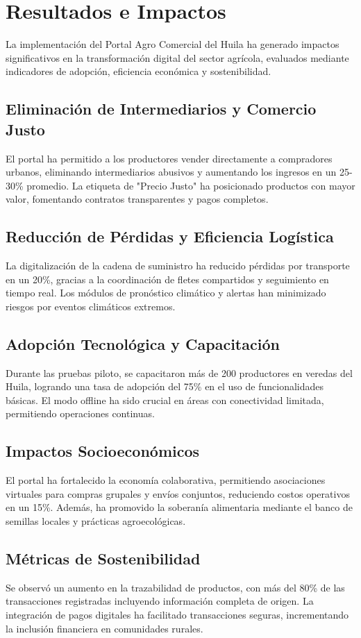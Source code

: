\section{Resultados e Impactos}
La implementación del Portal Agro Comercial del Huila ha generado impactos significativos en la transformación digital del sector agrícola, evaluados mediante indicadores de adopción, eficiencia económica y sostenibilidad.

\subsection{Eliminación de Intermediarios y Comercio Justo}
El portal ha permitido a los productores vender directamente a compradores urbanos, eliminando intermediarios abusivos y aumentando los ingresos en un 25-30\% promedio. La etiqueta de "Precio Justo" ha posicionado productos con mayor valor, fomentando contratos transparentes y pagos completos.

\subsection{Reducción de Pérdidas y Eficiencia Logística}
La digitalización de la cadena de suministro ha reducido pérdidas por transporte en un 20\%, gracias a la coordinación de fletes compartidos y seguimiento en tiempo real. Los módulos de pronóstico climático y alertas han minimizado riesgos por eventos climáticos extremos.

\subsection{Adopción Tecnológica y Capacitación}
Durante las pruebas piloto, se capacitaron más de 200 productores en veredas del Huila, logrando una tasa de adopción del 75\% en el uso de funcionalidades básicas. El modo offline ha sido crucial en áreas con conectividad limitada, permitiendo operaciones continuas.

\subsection{Impactos Socioeconómicos}
El portal ha fortalecido la economía colaborativa, permitiendo asociaciones virtuales para compras grupales y envíos conjuntos, reduciendo costos operativos en un 15\%. Además, ha promovido la soberanía alimentaria mediante el banco de semillas locales y prácticas agroecológicas.

\subsection{Métricas de Sostenibilidad}
Se observó un aumento en la trazabilidad de productos, con más del 80\% de las transacciones registradas incluyendo información completa de origen. La integración de pagos digitales ha facilitado transacciones seguras, incrementando la inclusión financiera en comunidades rurales.


